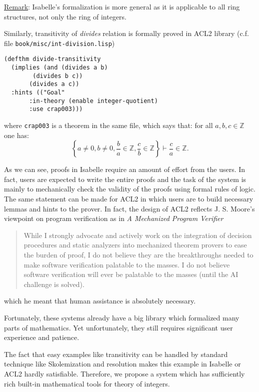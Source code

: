 \documentclass[12pt]{article}
\begin{document}
\underline{Remark}: Isabelle's formalization is more general as it is applicable to all ring structures, not only the ring of integers.

Similarly, transitivity of \emph{divides} relation is formally proved in ACL2 library (c.f. file \texttt{book/misc/int-division.lisp})
\begin{lstlisting}
(defthm divide-transitivity
  (implies (and (divides a b)
		(divides b c))
	   (divides a c))
  :hints (("Goal"
	   :in-theory (enable integer-quotient)
	   :use crap003)))
\end{lstlisting}
\newcommand{\setZ}{\mathbb{Z}}
where \texttt{crap003} is a theorem in the same file, which says that: for all $a,b,c \in \setZ$ one has:
$$\left\{ a \not= 0, b \not= 0, \frac{b}{a} \in \setZ,\frac{c}{b} \in \setZ \right\} \vdash \frac{c}{a} \in \setZ.$$

As we can see, proofs in Isabelle require an amount of effort from the users. In fact, users are expected to write the entire proofs and the task of the system is mainly to mechanically check the validity of the proofs using formal rules of logic. The same statement can be made for ACL2 in which users are to build necessary lemmas and hints to the prover. In fact, the design of ACL2 reflects J. S. Moore's viewpoint on program verification as in \emph{A Mechanized Program Verifier}
\begin{quote}
\scriptsize{While I strongly advocate and actively work on the integration of decision procedures and static
analyzers into mechanized theorem provers to ease the burden of proof, I do not believe they are
the breakthroughs needed to make software verification palatable to the masses. I do not believe
software verification will ever be palatable to the masses (until the AI challenge is solved).}
\end{quote}
which he meant that human assistance is absolutely necessary.

Fortunately, these systems already have a big library which formalized many parts of mathematics. Yet unfortunately, they still requires significant user experience and patience.


The fact that easy examples like transitivity can be handled by standard technique like Skolemization and resolution makes this example in Isabelle or ACL2 hardly satisfiable. Therefore, we propose a system which has sufficiently rich built-in mathematical tools for theory of integers.
\end{document}
